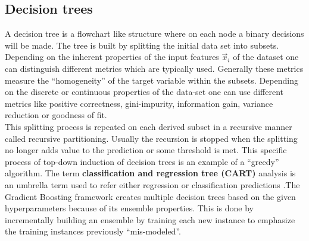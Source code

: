 \documentclass[12pt, a4paper]{article}
\begin{document}
\subsection{Decision trees}
A decision tree is a flowchart like structure where on each node a binary decisions will be made. The tree is built by splitting the initial data set into subsets. \\
Depending on the inherent properties of the input features $\vec{x}_i$ of the dataset one can distinguish different metrics which are typically used. Generally these metrics measure the ``homogeneity'' of the target variable within the subsets. Depending on the discrete or continuous properties of the data-set one can use different metrics like positive correctness, gini-impurity, information gain, variance reduction or goodness of fit. \\
This splitting process is repeated on each derived subset in a recursive manner called recursive partitioning. Usually the recursion is stopped when the splitting no longer adds value to the prediction or some threshold is met. This specific process of top-down induction of decision trees is an example of a ``greedy'' algorithm. The term \textbf{classification and regression tree (CART)} analysis is an umbrella term used to refer either regression or classification predictions \cite{Steinberg2009}.The Gradient Boosting framework creates multiple decision trees based on the given hyperparameters because of its ensemble properties. This is done by incrementally building an ensemble by training each new instance to emphasize the training instances previously ``mis-modeled''.
\end{document}
